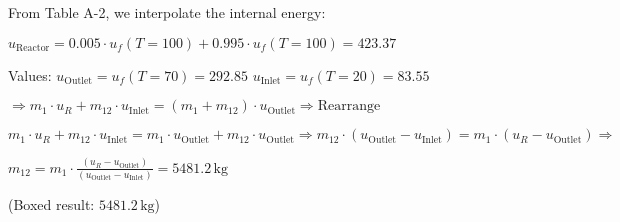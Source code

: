 From Table A-2, we interpolate the internal energy:  

\( u_{\text{Reactor}} = 0.005 \cdot u_f(T = 100) + 0.995 \cdot u_f(T = 100) = 423.37 \)  

Values:  
\( u_{\text{Outlet}} = u_f(T = 70) = 292.85 \)  
\( u_{\text{Inlet}} = u_f(T = 20) = 83.55 \)  

\(\Rightarrow m_1 \cdot u_R + m_{12} \cdot u_{\text{Inlet}} = (m_1 + m_{12}) \cdot u_{\text{Outlet}} \Rightarrow \text{Rearrange}\)  

\( m_1 \cdot u_R + m_{12} \cdot u_{\text{Inlet}} = m_1 \cdot u_{\text{Outlet}} + m_{12} \cdot u_{\text{Outlet}} \Rightarrow m_{12} \cdot (u_{\text{Outlet}} - u_{\text{Inlet}}) = m_1 \cdot (u_R - u_{\text{Outlet}}) \Rightarrow \)  

\( m_{12} = m_1 \cdot \frac{(u_R - u_{\text{Outlet}})}{(u_{\text{Outlet}} - u_{\text{Inlet}})} = 5481.2 \, \text{kg} \)  

(Boxed result: \( 5481.2 \, \text{kg} \))